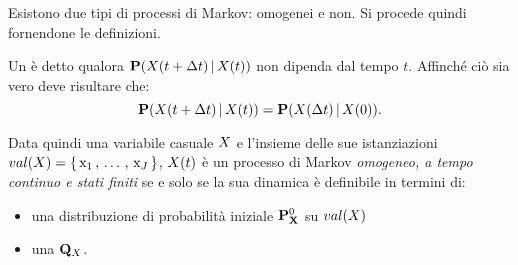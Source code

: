 Esistono due tipi di processi di Markov: omogenei e non. Si procede quindi fornendone le definizioni.

\begin{definizione}[\upcase\mprocess*{} \omog*{}]
\label{defn:homogeneus-markov-process}
Un \mprocess*{} è detto \emph{\omog*{}} qualora $\mathbf{P}(\mathnormal{X}(t + \Delta t)\,\arrowvert\,\mathnormal{X}(t))$ non dipenda dal tempo $t$. Affinché ciò sia vero deve risultare che:
\begin{equation}
\label{eq:homogeneus-markov-process}
\mathbf{P}(\mathnormal{X}(t + \Delta t)\,\arrowvert\,\mathnormal{X}(t))=\mathbf{P}(\mathnormal{X}(\Delta t)\,\arrowvert\,\mathnormal{X}(0))\text{.}
\end{equation}
\end{definizione}
Data quindi una variabile casuale $\mathnormal{X}$ e l'insieme delle sue istanziazioni $val(\mathnormal{X})=\{\,\mathrm{x}_1\,,\,\dotsc\,,\,\mathrm{x}_J\,\}$, $\mathnormal{X}(t)$ è un processo di Markov \emph{omogeneo, a tempo continuo e stati finiti} se e solo se la sua dinamica è definibile in termini di:
\begin{itemize}
    \item una distribuzione di probabilità iniziale $\mathbf{P}^0_{\mathbf{X}}$ su $val(\mathnormal{X})$
    \item una \im*{} $\mathbf{Q}_{\mathnormal{X}}$.
\end{itemize}

